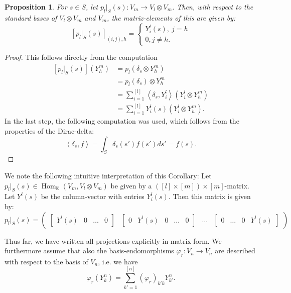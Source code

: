 \documentclass[12pt, a4paper]{article}
\theoremstyle{plain}
\newtheorem{pro}{Proposition}[section]
\theoremstyle{definition}
\theoremstyle{remark}
\newcommand{\K}{\mathds{K}}
\DeclareMathOperator{\Hom}{Hom}
\begin{document}
\begin{pro}
For $s \in S$, let $p_l|_S(s): V_m \to V_l \otimes V_m$. Then, with respect to the standard bases of $V_l \otimes V_m$ and $V_m$, the matrix-elements of this are given by:
\begin{equation*}
\left[ p_l|_S(s) \right]_{(i,j),h} = \begin{cases}
Y_i^{l}(s), \ j = h \\
0, j \neq h.
\end{cases}
\end{equation*}
\end{pro}

\begin{proof}
This follows directly from the computation
\begin{align*}
\left[ p_l|_S(s)\right] (Y_h^{m}) & = p_l(\delta_s \otimes Y_h^m) \\
& = p_l(\delta_s) \otimes Y_h^m \\
& = \sum_{i = 1}^{[l]} \left\langle \delta_s, Y_i^l\right\rangle \left( Y_i^l \otimes Y_h^m \right) \\
& = \sum_{i = 1}^{[l]}Y_i^l(s) \left( Y_i^l \otimes Y_h^m\right).
\end{align*}
In the last step, the following computation was used, which follows from the properties of the Dirac-delta:
\begin{equation*}
\left\langle \delta_s, f \right\rangle = \int_{S} \delta_s(s') f(s') ds' = f(s).
\end{equation*}
\end{proof}

We note the following intuitive interpretation of this Corollary: Let $p_l|_S(s) \in \Hom_\K(V_m, V_l \otimes V_m)$ be given by a $([l] \times [m]) \times [m]$-matrix. Let $Y^l(s)$ be the column-vector with entries $Y^l_i(s)$. Then this matrix is given by:
\begin{equation*}
p_l|_S(s) = \begin{pmatrix}
\begin{bmatrix}
Y^l(s) & 0 & \hdots & 0
\end{bmatrix}
&
\begin{bmatrix}
0 & Y^l(s) & 0 & \hdots & 0
\end{bmatrix}
&
\hdots
&
\begin{bmatrix}
0 & \hdots & 0 & Y^l(s)
\end{bmatrix}
\end{pmatrix}
\end{equation*}

Thus far, we have written all projections explicitly in matrix-form. We furthermore assume that also the basis-endomorphisms $\varphi_r: V_n \to V_n$ are described with respect to the basis of $V_n$, i.e. we have
\begin{equation*}
\varphi_r(Y^n_k) = \sum_{k' = 1}^{[n]} \left( \varphi_r\right)_{k'k} Y^n_{k'}.
\end{equation*}
\end{document}
